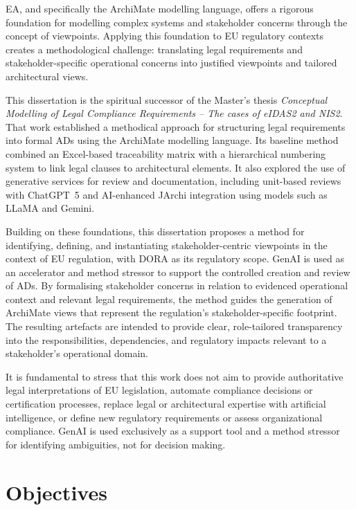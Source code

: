 \ac{EA}, and specifically the ArchiMate modelling language, offers a rigorous foundation for modelling complex systems and stakeholder concerns through the concept of viewpoints. Applying this foundation to \ac{EU} regulatory contexts creates a methodological challenge: translating legal requirements and stakeholder-specific operational concerns into justified viewpoints and tailored architectural views. 

This dissertation is the spiritual successor of the Master's thesis \textit{Conceptual Modelling of Legal Compliance Requirements -- The cases of \ac{eIDAS2} and \ac{NIS2}}. That work established a methodical approach for structuring legal requirements into formal \ac{AD}s using the ArchiMate modelling language. Its baseline method combined an Excel-based traceability matrix with a hierarchical numbering system to link legal clauses to architectural elements. It also explored the use of generative services for review and documentation, including unit-based reviews with ChatGPT~5 and AI-enhanced JArchi integration using models such as LLaMA and Gemini.

Building on these foundations, this dissertation proposes a method for identifying, defining, and instantiating stakeholder-centric viewpoints in the context of \ac{EU} regulation, with \ac{DORA} as its regulatory scope. \ac{GenAI} is used as an accelerator and method stressor to support the controlled creation and review of \ac{AD}s. By formalising stakeholder concerns in relation to evidenced operational context and relevant legal requirements, the method guides the generation of ArchiMate views that represent the regulation's stakeholder-specific footprint. The resulting artefacts are intended to provide clear, role-tailored transparency into the responsibilities, dependencies, and regulatory impacts relevant to a stakeholder's operational domain.

It is fundamental to stress that this work does not aim to provide authoritative legal interpretations of \ac{EU} legislation, automate compliance decisions or certification processes, replace legal or architectural expertise with artificial intelligence, or define new regulatory requirements or assess organizational compliance.
\ac{GenAI} is used exclusively as a support tool and a method stressor for identifying ambiguities, not for decision making.

\section{Objectives}

